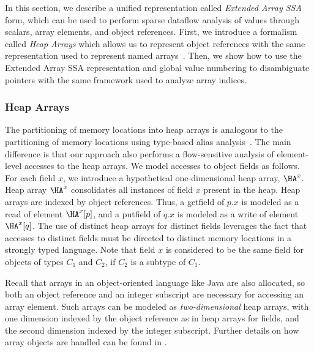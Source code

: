 In this section, we describe a unified representation called
{\em Extended Array SSA} form, which can be used to perform
sparse dataflow analysis of values through scalars, array
elements, and object references.  First, we introduce a
formalism called {\em Heap Arrays} which allows us to represent
object references with the same representation used to
represent named arrays~\cite{FiKS00}.   Then, we show how to use the
Extended Array SSA representation and global value numbering to
disambiguate pointers with the same framework used to analyze
array indices.

\subsubsection{Heap Arrays}\label{heaparray}
The partitioning of memory locations into
heap arrays is analogous to the partitioning of memory locations using
type-based alias analysis~\cite{DiwanMM1998}.  The main difference is that
our approach also performs a flow-sensitive analysis of
element-level accesses to the heap arrays.
We model accesses to object fields as follows.
For each field $x$, we introduce
a hypothetical one-dimensional
heap array,  $\HA^x$.
Heap array $\HA^x$ consolidates all instances of field
$x$ present in the heap.
Heap arrays are indexed by object references.
Thus, a {\sc getfield}
of $p.x$ is modeled as a read of element $\HA^x[p]$,
and a {\sc putfield} of $q.x$ is modeled as a write of element $\HA^x[q]$.
The use of distinct heap arrays for distinct fields leverages the 
fact that accesses to distinct fields must be directed to 
distinct memory locations in a strongly typed language.
Note that field $x$ is considered to be the same field for objects of types
$C_1$ and $C_2$, if $C_2$ is
a subtype of $C_1$.

Recall that 
arrays in an object-oriented language like Java
are also allocated, so both an object reference and an
integer subscript are necessary for accessing an array element. 
Such arrays can be modeled as {\it two-dimensional} heap
arrays, with one dimension indexed by
the object reference as in heap arrays for fields, and the second
dimension indexed by the integer subscript.  Further details on how 
array objects are handled can be found in \cite{FiKS00}.

